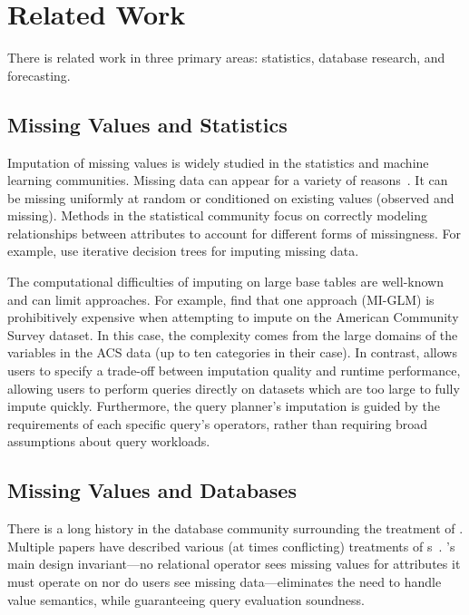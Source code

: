 \section{Related Work}

There is related work in three primary areas: statistics, database research, and forecasting.

\subsection{Missing Values and Statistics}

Imputation of missing values is widely studied in the statistics and machine
learning communities. Missing data
can appear for a variety of reasons~\cite{gelman2006data}.
It can be missing uniformly at random or conditioned on
existing values (observed and missing). Methods in the statistical community
focus on correctly modeling relationships between attributes to account for different forms
of missingness.
For example, \textcite*{burgette2010multiple} use iterative decision trees for imputing missing data.

The computational difficulties of imputing on large base
tables are well-known and can limit approaches. %
For example, \textcite*{akande2015empirical} find that one approach (MI-GLM) is prohibitively expensive when attempting to impute on the American Community Survey dataset.
In this case, the complexity comes from the large domains of the variables in the ACS data (up to ten categories in their case).
In contrast, \ProjectName{} allows users to specify a trade-off between
imputation quality and runtime performance, allowing users to perform queries
directly on datasets which are too large to fully impute quickly. Furthermore,
the query planner's imputation is guided by the requirements of each specific
query's operators, rather than requiring broad assumptions about query
workloads.  

\subsection{Missing Values and Databases}
There is a long history in the database community surrounding the
treatment of \nullv{}.
Multiple papers have described various (at times conflicting) treatments of \nullv{}s~\cite{codd1973understanding,grant1977null}.
\ProjectName's main design invariant---no relational operator
sees missing values for attributes it must operate on nor do users see
missing data---eliminates
the need to handle \nullv{} value semantics, while guaranteeing query evaluation soundness.

